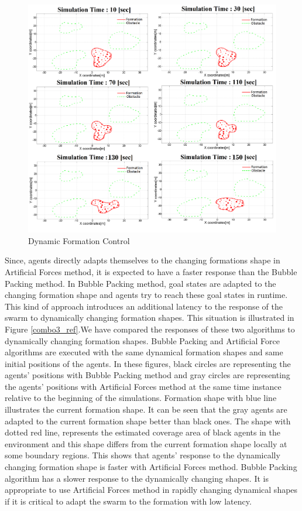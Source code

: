 \documentclass[letterpaper, 10 pt, conference]{ieeeconf}  %
\begin{document}
\begin{figure}[thpb]
\caption{Dynamic Formation Control} \label{multiple2_ref}
\centerline{\includegraphics[scale = 0.10]{deneme}}
\end{figure} 

Since, agents directly adapts themselves to the changing formations shape in Artificial Forces method, it is expected to have a faster response than the Bubble Packing method. In Bubble Packing method, goal states are adapted to the changing formation shape and agents try to reach these goal states in runtime. This kind of approach introduces an additional latency to the response of the swarm to dynamically changing formation shapes. This situation is illustrated in Figure \ref{combo3_ref}.We have compared the responses of these two algorithms to dynamically changing formation shapes. Bubble Packing and Artificial Force algorithms are executed with the same dynamical formation shapes and same initial positions of the agents. In these figures, black circles are representing the agents' positions with Bubble Packing method and gray circles are representing the agents' positions with Artificial Forces method at the same time instance relative to the beginning of the simulations. Formation shape with blue line illustrates the current formation shape. It can be seen that the gray agents are adapted to the current formation shape better than black ones. The shape with dotted red line, represents the estimated coverage area of black agents in the environment and this shape differs from the current formation shape locally at some boundary regions. This shows that agents' response to the dynamically changing formation shape is faster with Artificial Forces method. Bubble Packing algorithm has a slower response to the dynamically changing shapes. It is appropriate to use Artificial Forces method in rapidly changing dynamical shapes if it is critical to adapt the swarm to the formation with low latency.
\end{document}
